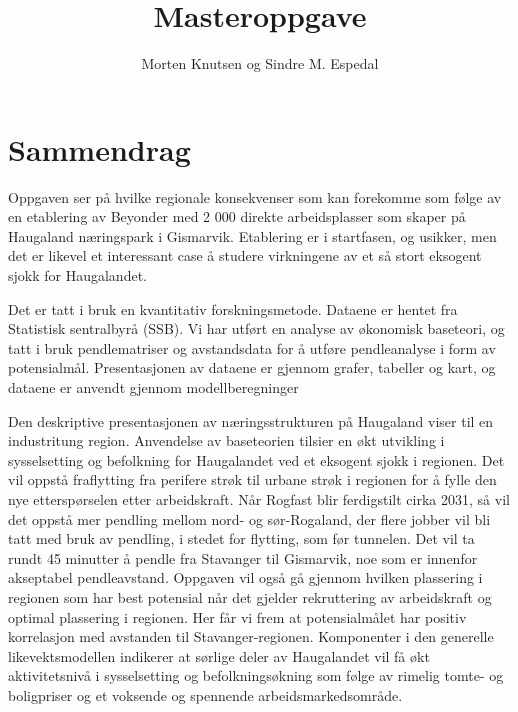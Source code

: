 \documentclass[
]{article}
\title{Masteroppgave}
\author{Morten Knutsen og Sindre M. Espedal}
\date{}
\begin{document}
\maketitle
\ifdefined\Shaded\renewenvironment{Shaded}{\begin{tcolorbox}[borderline west={3pt}{0pt}{shadecolor}, enhanced, sharp corners, breakable, boxrule=0pt, interior hidden, frame hidden]}{\end{tcolorbox}}\fi




\newpage
{}

\hypertarget{sammendrag}{%
\section*{Sammendrag}\label{sammendrag}}

Oppgaven ser på hvilke regionale konsekvenser som kan forekomme som
følge av en etablering av Beyonder med 2 000 direkte arbeidsplasser som
skaper på Haugaland næringspark i Gismarvik. Etablering er i startfasen,
og usikker, men det er likevel et interessant case å studere virkningene
av et så stort eksogent sjokk for Haugalandet.

Det er tatt i bruk en kvantitativ forskningsmetode. Dataene er hentet
fra Statistisk sentralbyrå (SSB). Vi har utført en analyse av økonomisk
baseteori, og tatt i bruk pendlematriser og avstandsdata for å utføre
pendleanalyse i form av potensialmål. Presentasjonen av dataene er
gjennom grafer, tabeller og kart, og dataene er anvendt gjennom
modellberegninger

Den deskriptive presentasjonen av næringsstrukturen på Haugaland viser
til en industritung region. Anvendelse av baseteorien tilsier en økt
utvikling i sysselsetting og befolkning for Haugalandet ved et eksogent
sjokk i regionen. Det vil oppstå fraflytting fra perifere strøk til
urbane strøk i regionen for å fylle den nye etterspørselen etter
arbeidskraft. Når Rogfast blir ferdigstilt cirka 2031, så vil det oppstå
mer pendling mellom nord- og sør-Rogaland, der flere jobber vil bli tatt
med bruk av pendling, i stedet for flytting, som før tunnelen. Det vil
ta rundt 45 minutter å pendle fra Stavanger til Gismarvik, noe som er
innenfor akseptabel pendleavstand. Oppgaven vil også gå gjennom hvilken
plassering i regionen som har best potensial når det gjelder
rekruttering av arbeidskraft og optimal plassering i regionen. Her får
vi frem at potensialmålet har positiv korrelasjon med avstanden til
Stavanger-regionen. Komponenter i den generelle likevektsmodellen
indikerer at sørlige deler av Haugalandet vil få økt aktivitetsnivå i
sysselsetting og befolkningsøkning som følge av rimelig tomte- og
boligpriser og et voksende og spennende arbeidsmarkedsområde.
\end{document}
